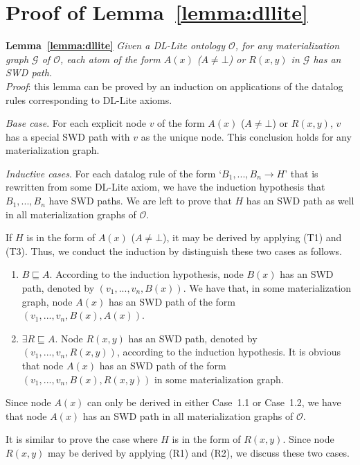 \documentclass[final,1p,times]{elsarticle}
\begin{document}
\section{Proof of Lemma~\ref{lemma:dllite}}

\textbf{Lemma~\ref{lemma:dllite}}
\emph{Given a DL-Lite ontology $\mathcal{O}$, for any materialization graph $\mathcal{G}$ of $\mathcal{O}$,
each atom of the form $A(x)$ ($A\neq\bot$) or $R(x,y)$ in $\mathcal{G}$ has an SWD path.}\\

\noindent\emph{Proof}: this lemma can be proved by an induction on applications of
the datalog rules corresponding to DL-Lite axioms.

\emph{Base case}. For each explicit node $v$ of the form $A(x)$ ($A\neq\bot$) or $R(x,y)$,
$v$ has a special SWD path with $v$ as the unique node. This conclusion holds
for any materialization graph.

\emph{Inductive cases}. For each datalog rule of the form `$B_1,...,B_n\rightarrow H$'
that is rewritten from some DL-Lite axiom, we have the induction hypothesis
that $B_1,...,B_n$ have SWD paths.
We are left to prove that $H$ has an SWD path as well
in all materialization graphs of $\mathcal{O}$.

If $H$ is in the form of $A(x)$ ($A\neq\bot$), it may be derived by
applying (T1) and (T3). Thus, we conduct the induction by
distinguish these two cases as follows.

\begin{enumerate}[leftmargin=12ex,label=Case~1.\arabic*]
\item $B\sqsubseteq A$. According to the induction hypothesis,
node $B(x)$ has an SWD path, denoted by $(v_1,...,v_n,B(x))$.
We have that, in some materialization graph, node $A(x)$
has an SWD path of the form $(v_1,...,v_n,B(x),A(x))$.

\item $\exists R\sqsubseteq A$. Node $R(x,y)$ has an SWD path,
denoted by $(v_1,...,v_n,R(x,y))$,
according to the induction hypothesis.
It is obvious that node $A(x)$
has an SWD path of the form $(v_1,...,v_n,B(x),R(x,y))$
in some materialization graph.
\end{enumerate}

Since node $A(x)$ can only be derived in either Case~1.1
or Case~1.2, we have that
node $A(x)$ has an SWD path in all materialization graphs of $\mathcal{O}$.

It is similar to prove the case where $H$ is in the form of $R(x,y)$.
Since node $R(x,y)$ may be derived by
applying (R1) and (R2), we discuss these two cases.
\end{document}
